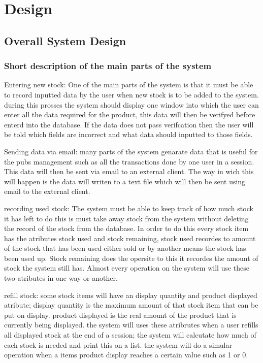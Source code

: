 \chapter{Design}

\section{Overall System Design}

\subsection{Short description of the main parts of the system}

Entering new stock: One of the main parts of the system is that it must be able to record inputted data by the user when new stock is to be added to the system. during this prosses the system should display one window into which the user can enter all the data required for the product, this data will then be verifyed before enterd into the database. If the data does not pass verifcation then the user will be told which fields are incorrect and what data should inputted to those fields.

Sending data via email: many parts of the system genarate data that is useful for the pubs management such as all the transactions done by one user in a session. This data will then be sent via email to an external client. The way in wich this will happen is the data will writen to a text file which will then be sent using email to the external client.

recording used stock: The system must be able to keep track of how much stock it has left to do this is must take away stock from the system without deleting the record of the stock from the database. In order to do this every stock item has the atributes stock used and stock remaining, stock used recordes to amount of the stock that has been used either sold or by another means the stock has been used up. Stock remaining does the opersite to this it recordes the amount of stock the system still has. Almost every operation on the system will use these two atributes in one way or another.

refill stock: some stock items will have an display quantity and product displayed atribute; display quantity is the maximum amount of that stock item that can be put on display. product displayed is the real amount of the product that is currently being displayed. the system will uses these atribrutes when a user refills all displayed stock at the end of a session; the system will calcutate how much of each stock is needed and print this on a list. the system will do a simular operation when a items product display reaches a certain value such as 1 or 0.

